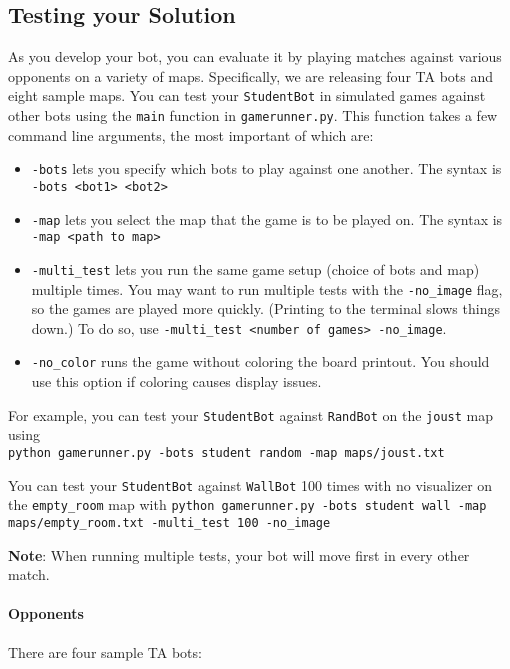 \documentclass{article}
\begin{document}
\subsection{Testing your Solution}
As you develop your bot, you can evaluate it by playing matches
against various opponents on a variety of maps.  Specifically, we are
releasing four TA bots and eight sample maps.
%
\newline
You can test your \texttt{StudentBot} in simulated games against other
bots using the \texttt{main} function in \texttt{gamerunner.py}.  This
function takes a few command line arguments, the most important of
which are:

\begin{itemize}
\item \texttt{-bots} lets you specify which bots to play against one another. The syntax is \texttt{-bots <bot1> <bot2>}

\item \texttt{-map} lets you select the map that the game is to be played on. The syntax is \texttt{-map <path to map>}

\item \texttt{-multi\_test} lets you run the same game setup (choice of bots and map) multiple times.
  You may want to run multiple tests with the \texttt{-no\_image} flag, so the games are played more quickly.
  (Printing to the terminal slows things down.)
  To do so, use \texttt{-multi\_test <number of games> -no\_image}.

\item \texttt{-no\_color} runs the game without coloring the board printout.
  You should use this option if coloring causes display issues.
\end{itemize}

For example, you can test your \texttt{StudentBot} against \texttt{RandBot} on the \texttt{joust} map using \\
\texttt{python gamerunner.py -bots student random -map maps/joust.txt}

You can test your \texttt{StudentBot} against \texttt{WallBot} 100 times with no visualizer on the \texttt{empty\_room} map with
\texttt{python gamerunner.py -bots student wall -map maps/empty\_room.txt -multi\_test 100 -no\_image}

\textbf{Note}: When running multiple tests, your bot will move first in every other match.


\paragraph{Opponents}
There are four sample TA bots:
\end{document}
